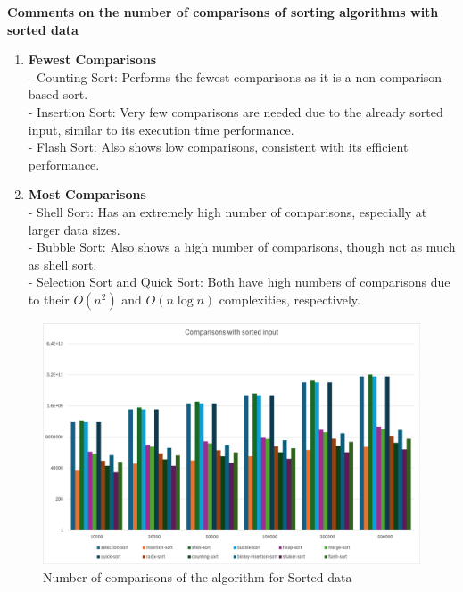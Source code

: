 \textbf{Comments on the number of comparisons of sorting algorithms with sorted data}
\begin{enumerate}
    \item \textbf{Fewest Comparisons} \\
   - Counting Sort: Performs the fewest comparisons as it is a non-comparison-based sort. \\
   - Insertion Sort: Very few comparisons are needed due to the already sorted input, similar to its execution time performance. \\
   - Flash Sort: Also shows low comparisons, consistent with its efficient performance.

    \item \textbf{Most Comparisons} \\
   - Shell Sort: Has an extremely high number of comparisons, especially at larger data sizes. \\
   - Bubble Sort: Also shows a high number of comparisons, though not as much as shell sort. \\
   - Selection Sort and Quick Sort: Both have high numbers of comparisons due to their \(O(n^2)\) and \(O(n\log n)\) complexities, respectively.
\end{enumerate}

\begin{figure}[h]
    \centering
    \includegraphics[scale=.65]{Figures/Visualization/Sorted_compare.png}
    \caption{Number of comparisons of the algorithm for Sorted data}
    \label{fig:enter-label}
\end{figure}

\newpage

